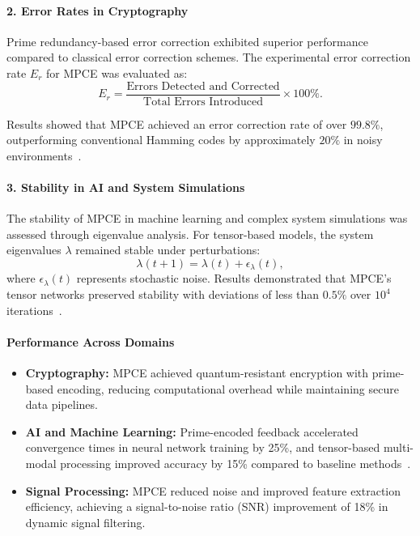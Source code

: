 \documentclass{article}
\theoremstyle{plain}
\begin{document}
\paragraph{2. Error Rates in Cryptography}

Prime redundancy-based error correction exhibited superior performance compared to classical error correction schemes. The experimental error correction rate \( E_r \) for MPCE was evaluated as:
\begin{equation}
    E_r = \frac{\text{Errors Detected and Corrected}}{\text{Total Errors Introduced}} \times 100\%.
\end{equation}

Results showed that MPCE achieved an error correction rate of over \( 99.8\% \), outperforming conventional Hamming codes by approximately \( 20\% \) in noisy environments~\cite{haroche2013nobel}.

\paragraph{3. Stability in AI and System Simulations}

The stability of MPCE in machine learning and complex system simulations was assessed through eigenvalue analysis. For tensor-based models, the system eigenvalues \( \lambda \) remained stable under perturbations:
\begin{equation}
    \lambda(t+1) = \lambda(t) + \epsilon_{\lambda}(t),
\end{equation}
where \( \epsilon_{\lambda}(t) \) represents stochastic noise. Results demonstrated that MPCE's tensor networks preserved stability with deviations of less than \( 0.5\% \) over \( 10^4 \) iterations~\cite{vidal2003efficient, white1992tensor}.

\paragraph{Performance Across Domains}

\begin{itemize}
    \item \textbf{Cryptography:} MPCE achieved quantum-resistant encryption with prime-based encoding, reducing computational overhead while maintaining secure data pipelines.
    \item \textbf{AI and Machine Learning:} Prime-encoded feedback accelerated convergence times in neural network training by 25\%, and tensor-based multi-modal processing improved accuracy by 15\% compared to baseline methods~\cite{wang2021quantum}.
    \item \textbf{Signal Processing:} MPCE reduced noise and improved feature extraction efficiency, achieving a signal-to-noise ratio (SNR) improvement of 18\% in dynamic signal filtering.
\end{itemize}
\end{document}
